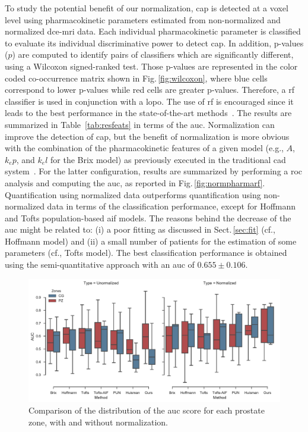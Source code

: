 To study the potential benefit of our normalization, \ac{cap} is detected at a voxel level using pharmacokinetic parameters estimated from non-normalized and normalized \ac{dce}-\ac{mri} data.
Each individual pharmacokinetic parameter is classified to evaluate its individual discriminative power to detect \ac{cap}.
In addition, p-values ($p$) are computed to identify pairs of classifiers
which are significantly different, using a Wilcoxon signed-ranked
test. Those p-values are represented in the color coded co-occurrence
matrix shown in Fig.\,\ref{fig:wilcoxon}, where blue cells correspond
to lower p-values while red cells are greater p-values.
Therefore, a \ac{rf} classifier is used in conjunction with a \ac{lopo}.
The use of \ac{rf} is encouraged since it leads to the best performance in the state-of-the-art methods~\cite{litjens2014computer,lemaitre2015computer}.
The results are summarized in Table~\ref{tab:resfeats} in terms of the \ac{auc}.
Normalization can improve the detection of \ac{cap}, but the benefit
of normalization is more obvious with the combination of the
pharmacokinetic features of a given model (e.g., $A$, $k_ep$, and
$k_el$ for the Brix model) as previously executed in the traditional \ac{cad} system~\cite{lemaitre2015computer}.
For the latter configuration, results are summarized by performing a \ac{roc} analysis and computing the \ac{auc}, as reported in Fig.\,\ref{fig:normpharmarf}.
Quantification using normalized data outperforms quantification using
non-normalized data in terms of the classification performance, except
for Hoffmann and Tofts population-based \ac{aif} models.
The reasons behind the decrease of the \ac{auc} might be related to:
(i) a poor fitting as discussed in Sect.\,\ref{sec:fit} (cf., Hoffmann
model) and (ii) a small number of patients for the estimation of some parameters (cf., Tofts model).
The best classification performance is obtained using the
semi-quantitative approach with an \ac{auc} of $0.655 \pm 0.106$.


\begin{figure}
  \centering
  \includegraphics[width=1.\linewidth]{03_experiments/figures/plot_auc_by_zones.pdf}
  \caption{Comparison of the distribution of the \acs*{auc} score for
    each prostate zone, with and without normalization.}
  \label{fig:boxplot}
\end{figure}

